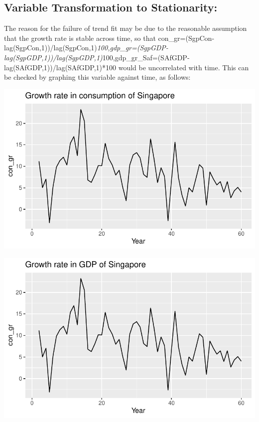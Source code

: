 \documentclass[
  letterpaper,
  DIV=11,
  numbers=noendperiod]{scrartcl}
\begin{document}
\hypertarget{variable-transformation-to-stationarity}{%
\subsection{Variable Transformation to
Stationarity:}\label{variable-transformation-to-stationarity}}

The reason for the failure of trend fit may be due to the reasonable
assumption that the growth rate is stable across time, so that
con\_gr=(SgpCon-lag(SgpCon,1))/lag(SgpCon,1)\emph{100,gdp\_gr=(SgpGDP-lag(SgpGDP,1))/lag(SgpGDP,1)}100,gdp\_gr\_Saf=(SAfGDP-lag(SAfGDP,1))/lag(SAfGDP,1)*100
would be uncorrelated with time. This can be checked by graphing this
variable against time, as follows:

\includegraphics{Spurious-Regressions_files/figure-pdf/unnamed-chunk-5-1.pdf}

\includegraphics{Spurious-Regressions_files/figure-pdf/unnamed-chunk-5-2.pdf}
\end{document}
